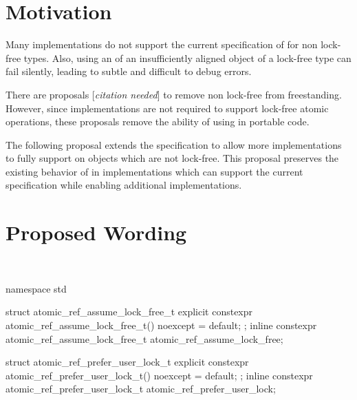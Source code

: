 \section*{Motivation}

Many implementations do not support the current specification of 
for non lock-free types.  Also, using an  of an insufficiently aligned object 
of a lock-free type can fail silently, leading to subtle and difficult to debug
errors.

There are proposals [\textit{citation needed}] to remove non lock-free 
from freestanding.  However, since implementations are not required to support
lock-free atomic operations, these proposals remove the ability of using 
in portable code.

The following proposal extends the  specification to allow more
implementations to fully support  on objects which are not  
lock-free.  This proposal preserves the existing behavior of 
in implementations which can support the current specification while enabling 
additional implementations.

\section*{Proposed Wording}

 \\

%
%

\begin{addedblock}
\begin{codeblock}
namespace std {
  struct atomic_ref_assume_lock_free_t {
    explicit constexpr atomic_ref_assume_lock_free_t() noexcept = default;
  };
  inline constexpr atomic_ref_assume_lock_free_t atomic_ref_assume_lock_free{};

  struct atomic_ref_prefer_user_lock_t { 
    explicit constexpr atomic_ref_prefer_user_lock_t() noexcept = default;
  };
  inline constexpr atomic_ref_prefer_user_lock_t atomic_ref_prefer_user_lock{};
}
\end{codeblock}
\end{addedblock}


